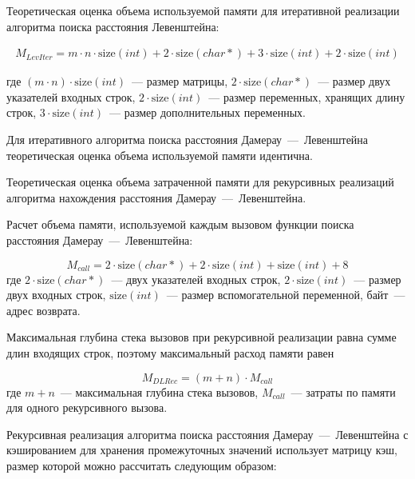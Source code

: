 Теоретическая оценка объема используемой памяти для итеративной реализации алгоритма поиска расстояния Левенштейна:

\begin{multline}
	M_{LevIter} = m \cdot n \cdot \text{size}(int) +  2 \cdot  \text{size}(char * ) + 3 \cdot \text{size}(int) + 2 \cdot \text{size}(int)
\end{multline}

где $(m \cdot n) \cdot \text{size}(int)$~--- размер матрицы,
\newline $2 \cdot \text{size}(char *)$~--- размер двух указателей входных строк,
\newline $2 \cdot \text{size}(int)$~--- размер переменных, хранящих длину строк,
\newline $3 \cdot \text{size}(int)$~--- размер дополнительных переменных.

Для итеративного алгоритма поиска расстояния Дамерау~---~Левенштейна теоретическая оценка объема используемой памяти идентична.

Теоретическая оценка объема затраченной памяти для рекурсивных реализаций алгоритма нахождения расстояния Дамерау~---~Левенштейна.

Расчет объема памяти, используемой каждым вызовом функции поиска расстояния Дамерау~---~Левенштейна:

\begin{equation}
	M_{call} = 2 \cdot \text{size}(char *) + 2 \cdot \text{size}(int) + \text{size}(int) + 8
\end{equation}
где $2 \cdot \text{size}(char *)$~--- двух указателей входных строк,
\newline $2 \cdot \text{size}(int)$~--- размер двух входных строк,
\newline $\text{size}(int)$~--- размер вспомогательной переменной,
 байт~--- адрес возврата.

Максимальная глубина стека вызовов при рекурсивной реализации равна сумме длин входящих строк, поэтому максимальный расход памяти равен

\begin{equation}
	M_{DLRec} = (m + n) \cdot M_{call}
\end{equation}
где $m + n$~--- максимальная глубина стека вызовов,
\newline $M_{call}$~--- затраты по памяти для одного рекурсивного вызова.

Рекурсивная реализация алгоритма поиска расстояния Дамерау~---~Левенштейна с кэшированием для хранения промежуточных значений использует матрицу кэш, размер которой можно рассчитать следующим образом:

